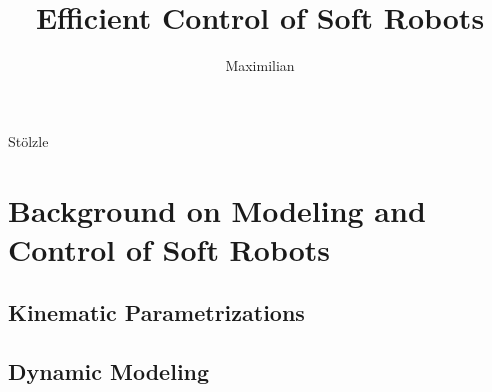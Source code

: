 \documentclass{dissertation}
\begin{document}
\title[Synergizing Physics and Learned Models for Ensuring Precision and Safety]{Efficient Control of Soft Robots}

\author{Maximilian}{Stölzle}

\frontmatter




\tableofcontents



\mainmatter

\thumbtrue



\chapter{Background on Modeling and Control of Soft Robots}\label{chp:background}
\section{Kinematic Parametrizations}
\section{Dynamic Modeling}
\end{document}
